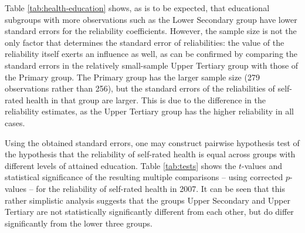\documentclass[a4paper, 11pt]{article}
\newcommand{\0}{\boldsymbol{0}}
\begin{document}
Table \ref{tab:health-education} shows, as is to be expected, that educational subgroups with more observations 
such as the Lower Secondary group have lower standard errors for the reliability coefficients. However, the sample size
is not the only factor that determines the standard error of reliabilities: the value of the reliability itself exerts an influence as well,
as can be confirmed by comparing the standard errors in the relatively small-sample Upper Tertiary group with those of the Primary group.
The Primary group has the larger sample size (279 observations rather than 256), but the standard errors of the reliabilities
of self-rated health in that group are larger. This is due to the difference in the reliability estimates, as the Upper Tertiary group 
has the higher reliability in all cases.

Using the obtained standard errors, one may construct pairwise hypothesis test of the hypothesis that the reliability of self-rated health
is equal across groups with different levels of attained education. Table \ref{tab:tests} shows the $t$-values and statistical significance of the resulting multiple comparisons -- using corrected $p$-values  \citep{holm1979simple} -- for the reliability of self-rated health in 2007. It can be seen that this rather simplistic analysis suggests that the 
groups Upper Secondary and Upper Tertiary are not statistically significantly different from each other, but do 
differ significantly from the lower three groups.
\end{document}
